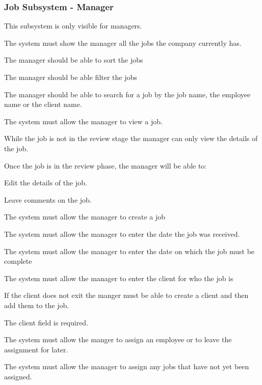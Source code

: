 \documentclass{article}
\begin{document}
	\subsubsection*{Job Subsystem - Manager}	
	\begin{list}{R.}{}
		\item This subsystem is only visible for managers.
		\item The system must show the manager all the jobs the company currently has. 
		\begin{list}{R.}{}
			\item The manager should be able to sort the jobs
			\item The manager should be able filter the jobs 
			\item The manager should be able to search for a job by the job name, the employee name or the client name. 
		\end{list}
		\item The system must allow the manager to view a job.
		\begin{list}{R.}{}
			\item While the job is not in the review stage the manager can only view the details of the job.
			\item Once the job is in the review phase, the manager will be able to: 
			\begin{list}{R..}{}
				\item Edit the details of the job.
				\item Leave comments on the job.
			\end{list}
		\end{list}
		\item The system must allow the manager to create a job
		\begin{list}{R.}{}
			\item The system must allow the manager to enter the date the job was received.
			\item The system must allow the manager to enter the date on which the job must be complete 
			\item The system must allow the manager to enter the client for who the job is
			\begin{list}{R..}{}
				\item If the client does not exit the manger must be able to create a client and then add them to the job.
				\item The client field is required.
			\end{list}
			\item The system must allow the manger to assign an employee or to leave the assignment for later.
		\end{list}
		\item The system must allow the manager to assign any jobs that have not yet been assigned.
		
	\end{list}
\end{document}
